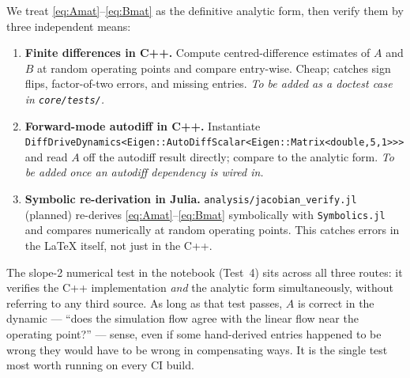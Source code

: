 We treat \eqref{eq:Amat}--\eqref{eq:Bmat} as the definitive analytic form, then verify them by three independent means:

\begin{enumerate}
    \item \textbf{Finite differences in C++.} Compute centred-difference estimates of $A$ and $B$ at random operating points and compare entry-wise. Cheap; catches sign flips, factor-of-two errors, and missing entries. \emph{To be added as a doctest case in \texttt{core/tests/}.}
    \item \textbf{Forward-mode autodiff in C++.} Instantiate \texttt{DiffDriveDynamics<\linebreak[1]Eigen::AutoDiffScalar<Eigen::Matrix<double,5,1>>>} and read $A$ off the autodiff result directly; compare to the analytic form. \emph{To be added once an autodiff dependency is wired in.}
    \item \textbf{Symbolic re-derivation in Julia.} \texttt{analysis/jacobian\_verify.jl} (planned) re-derives \eqref{eq:Amat}--\eqref{eq:Bmat} symbolically with \texttt{Symbolics.jl} and compares numerically at random operating points. This catches errors in the LaTeX itself, not just in the C++.
\end{enumerate}

The slope-2 numerical test in the notebook (Test~4) sits across all three routes: it verifies the C++ implementation \emph{and} the analytic form simultaneously, without referring to any third source. As long as that test passes, $A$ is correct in the dynamic --- ``does the simulation flow agree with the linear flow near the operating point?'' --- sense, even if some hand-derived entries happened to be wrong they would have to be wrong in compensating ways. It is the single test most worth running on every CI build.
